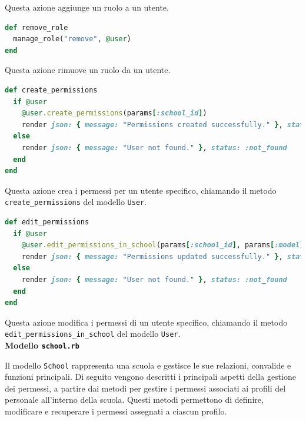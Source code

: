\documentclass[a4paper, 12pt]{book}
\begin{document}
Questa azione aggiunge un ruolo a un utente.

\begin{lstlisting}[language=Ruby, caption=Azione \texttt{remove\_role}]
def remove_role
  manage_role("remove", @user)
end
\end{lstlisting}

Questa azione rimuove un ruolo da un utente.

\begin{lstlisting}[language=Ruby, caption=Azione \texttt{create\_permissions}]
def create_permissions
  if @user
    @user.create_permissions(params[:school_id])
    render json: { message: "Permissions created successfully." }, status: :ok
  else
    render json: { message: "User not found." }, status: :not_found
  end
end
\end{lstlisting}

Questa azione crea i permessi per un utente specifico, chiamando il metodo \texttt{create\_permissions}
del modello \texttt{User}.

\begin{lstlisting}[language=Ruby, caption=Azione \texttt{edit\_permissions}]
def edit_permissions
  if @user
    @user.edit_permissions_in_school(params[:school_id], params[:model], params[:permissions])
    render json: { message: "Permissions updated successfully." }, status: :ok
  else
    render json: { message: "User not found." }, status: :not_found
  end
end
\end{lstlisting}

Questa azione modifica i permessi di un utente specifico, chiamando il
metodo \texttt{edit\_permissions\_in\_school} del modello \texttt{User}.\\

\textbf{Modello \texttt{school.rb}}

Il modello \texttt{School} rappresenta una scuola e gestisce le sue relazioni, convalide e
funzioni principali. Di seguito vengono descritti i principali aspetti della gestione dei permessi, a partire dai metodi
per gestire i permessi associati ai profili del personale all'interno della scuola.
Questi metodi permettono di definire, modificare e recuperare i permessi assegnati a ciascun profilo.
\end{document}
